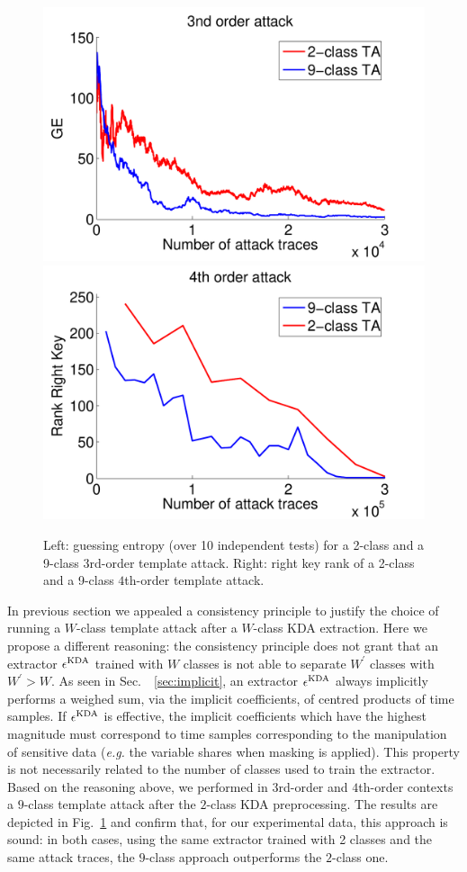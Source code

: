 \begin{figure}
\includegraphics[width=.5\textwidth]{../Figures/CARDIS2016/3order_2_9.pdf} 
\includegraphics[width=.5\textwidth]{../Figures/CARDIS2016/4order_2_9.pdf} 
\caption[KDA preprocessing performance for  $3$rd-order and $4$th-order template attack]{Left: guessing entropy (over 10 independent tests) for a 2-class and a 9-class $3$rd-order template attack. Right: right key rank of a 2-class and a 9-class $4$th-order template attack.}\label{fig:3-4}
\end{figure}
In previous section we appealed a consistency principle to justify the choice of running a $W$-class template attack after a $W$-class KDA extraction. Here we propose a different reasoning: the consistency principle does not grant that an extractor $\epsilon^{\mathrm{KDA}}$ trained with $W$ classes is not able to separate $W^\prime$ classes with $W^\prime > W$. As seen in Sec.~~\ref{sec:implicit}, an extractor $\epsilon^{\mathrm{KDA}}$ always implicitly performs a weighed sum, via the implicit coefficients, of centred products of time samples. If $\epsilon^{\mathrm{KDA}}$ is effective, the implicit coefficients which have the highest magnitude must correspond to time samples corresponding to the manipulation of sensitive data (\emph{e.g.} the variable shares when masking is applied). This property is not necessarily related to the number of classes used to train the extractor.\\

Based on the reasoning above, we performed in $3$rd-order and $4$th-order contexts a $9$-class template attack after the $2$-class KDA preprocessing.  The results are depicted in Fig.~\ref{fig:3-4} and confirm that, for our experimental data, this approach is sound: in both cases, using the same extractor trained with 2 classes and the same attack traces, the $9$-class approach outperforms the $2$-class one.
 
